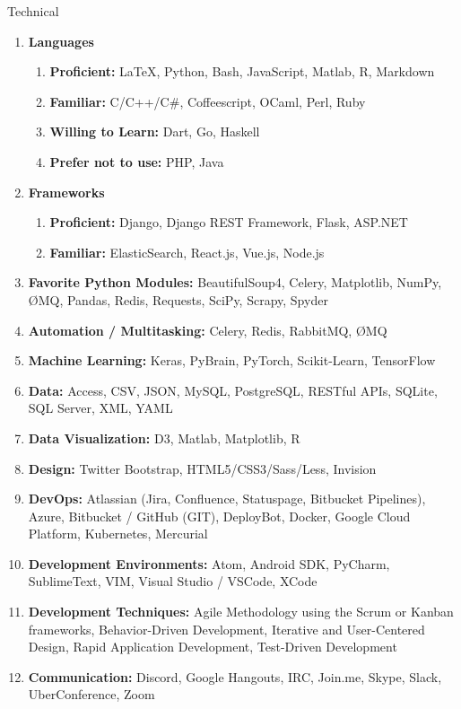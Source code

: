 \documentclass[oneside]{article}%
\begin{document}
\newpage
\noindent
\huge{Technical}
\small
\begin{enumerate}[]
	\item \textbf{Languages}
		\begin{enumerate}[*]
			 \item \textbf{Proficient:} \LaTeX, Python, Bash, JavaScript, Matlab, R, Markdown
			 \item \textbf{Familiar:} C/C++/C\#, Coffeescript, OCaml, Perl, Ruby
			 \item \textbf{Willing to Learn:} Dart, Go, Haskell
			 \item \textbf{Prefer not to use:} PHP, Java
		\end{enumerate}
	\item \textbf{Frameworks}
		\begin{enumerate}[*]
			 \item \textbf{Proficient:} Django, Django REST Framework, Flask, ASP.NET
			 \item \textbf{Familiar:} ElasticSearch, React.js, Vue.js, Node.js
		\end{enumerate}
	\item \textbf{Favorite Python Modules:} BeautifulSoup4, Celery, Matplotlib, NumPy, ØMQ, Pandas, Redis, Requests, SciPy, Scrapy, Spyder
	\item \textbf{Automation / Multitasking:} Celery, Redis, RabbitMQ, ØMQ
	\item \textbf{Machine Learning:} Keras, PyBrain, PyTorch, Scikit-Learn, TensorFlow
	\item \textbf{Data:} Access, CSV, JSON, MySQL, PostgreSQL, RESTful APIs, SQLite, SQL Server, XML, YAML
	\item \textbf{Data Visualization:} D3, Matlab, Matplotlib, R
	\item \textbf{Design:} Twitter Bootstrap, HTML5/CSS3/Sass/Less, Invision
	\item \textbf{DevOps:} Atlassian (Jira, Confluence, Statuspage, Bitbucket Pipelines), Azure, Bitbucket / GitHub (GIT), DeployBot, Docker, Google Cloud Platform, Kubernetes, Mercurial
	\item \textbf{Development Environments:} Atom, Android SDK, PyCharm, SublimeText, VIM, Visual Studio / VSCode, XCode
	\item \textbf{Development Techniques:} Agile Methodology using the Scrum or Kanban frameworks, Behavior-Driven Development, Iterative and User-Centered Design, Rapid Application Development, Test-Driven Development
	\item \textbf{Communication:} Discord, Google Hangouts, IRC, Join.me, Skype, Slack, UberConference, Zoom

\end{enumerate}
\end{document}
